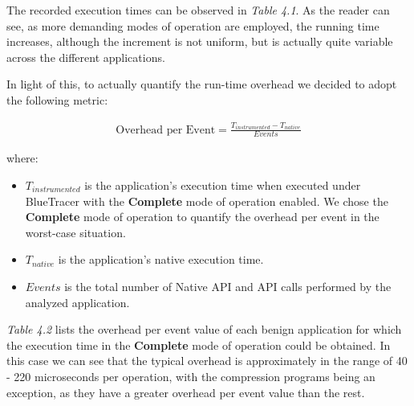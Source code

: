 The recorded execution times can be observed in \textit{Table 4.1}. As the reader can see, as more demanding modes of operation are employed, the running time increases, although the increment is not uniform, but is actually quite variable across the different applications.

In light of this, to actually quantify the run-time overhead we decided to adopt the following metric:

\begin{align*}
\text{Overhead per Event} = \frac{T_{instrumented} - T_{native}}{Events}
\end{align*}

where:
\begin{itemize}
\item $T_{instrumented}$ is the application's execution time when executed under BlueTracer with the \textbf{Complete} mode of operation enabled. We chose the \textbf{Complete} mode of operation to quantify the overhead per event in the worst-case situation.
\item $T_{native}$ is the application's native execution time.
\item $Events$ is the total number of Native API and API calls performed by the analyzed application.
\end{itemize}

\textit{Table 4.2} lists the overhead per event value of each benign application for which the execution time in the \textbf{Complete} mode of operation could be obtained. In this case we can see that the typical overhead is approximately in the range of 40 - 220 microseconds per operation, with the compression programs being an exception, as they have a greater overhead per event value than the rest.

